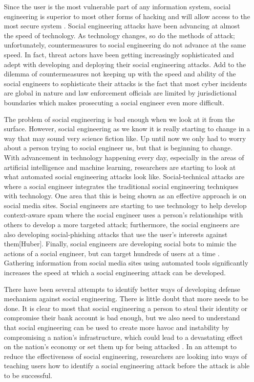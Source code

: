 \documentclass[conference]{IEEEtran}
\begin{document}
Since the user is the most vulnerable part of any information system, social engineering is superior to most other forms of hacking and will allow access to the most secure system \cite{krombholz_hobel_huber_weippl_2015}. Social engineering attacks have been advancing at almost the speed of technology.  As technology changes, so do the methods of attack; unfortunately, countermeasures to social engineering do not advance at the same speed.  In fact, threat actors have been getting increasingly sophisticated and adept with developing and deploying their social engineering attacks\cite{conteh_schmick_2016}. Add to the dilemma of countermeasures not keeping up with the speed and ability of the social engineers to sophisticate their attacks is the fact that most cyber incidents are global in nature and law enforcement officials are limited by jurisdictional boundaries which makes prosecuting a social engineer even more difficult\cite{conteh_schmick_2016}. 

The problem of social engineering is bad enough when we look at it from the surface.  However, social engineering as we know it is really starting to change in a way that may sound very science fiction like. Up until now we only had to worry about a person trying to social engineer us, but that is beginning to change. With advancement in technology happening every day, especially in the areas of artificial intelligence and machine learning, researchers are starting to look at what automated social engineering attacks look like. Social-technical attacks are where a social engineer integrates the traditional social engineering techniques with technology.  One area that this is being shown as an effective approach is on social media sites.  Social engineers are starting to use technology to help develop context-aware spam where the social engineer uses a person's relationships with others to develop a more targeted attack; furthermore, the social engineers are also developing social-phishing attacks that use the user's interests against them[Huber]. Finally, social engineers are developing social bots to mimic the actions of a social engineer, but can target hundreds of users at a time \cite{Huber:2010:CAS:1866423.1866435}\cite{wagner}\cite{Postnikoff:2018:RSE:3173386.3176908}.   Gathering information from social media sites using automated tools significantly increases the speed at which a social engineering attack can be developed. 

There have been several attempts to identify better ways of developing defense mechanism against social engineering. There is little doubt that more needs to be done. It is clear to most that social engineering a person to steal their identity or compromise their bank account is bad enough, but we also need to understand that social engineering can be used to create more havoc and instability by compromising a nation's infrastructure, which could lead to a devastating effect on the nation's economy or set them up for being attacked \cite{Green:2015:ISE:2808705.2808717}.  In an attempt to reduce the effectiveness of social engineering, researchers are looking into ways of teaching users how to identify a social engineering attack before the attack is able to be successful.
\end{document}
